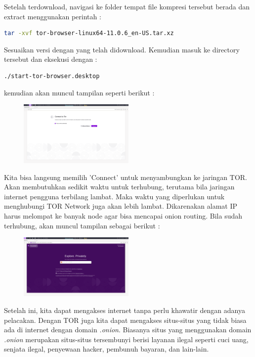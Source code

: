\documentclass{article}
\begin{document}
        Setelah terdownload, navigasi ke folder tempat file kompresi tersebut berada dan
        extract menggunakan perintah :
        \begin{lstlisting}[language=bash]
           tar -xvf tor-browser-linux64-11.0.6_en-US.tar.xz 
        \end{lstlisting}
        Sesuaikan versi dengan yang telah didownload. Kemudian masuk ke directory tersebut
        dan eksekusi dengan :
        \begin{lstlisting}[language=bash]
            ./start-tor-browser.desktop
        \end{lstlisting}
        kemudian akan muncul tampilan seperti berikut :
        \begin{figure}[h]
        \includegraphics[width=0.5\textwidth]{tor-first.png}
        \centering
        \end{figure}

        Kita bisa langsung memilih 'Connect' untuk menyambungkan ke jaringan TOR.
        Akan membutuhkan sedikit waktu untuk terhubung, terutama bila jaringan
        internet pengguna terbilang lambat. Maka waktu yang diperlukan untuk 
        menghubungi TOR Network juga akan lebih lambat. Dikarenakan alamat IP harus
        melompat ke banyak node agar bisa mencapai onion routing.
        Bila sudah terhubung, akan muncul tampilan sebagai berikut :
        \begin{figure}[h]
        \includegraphics[width=0.5\textwidth]{tor-connect.png}
        \centering
        \end{figure}

        Setelah ini, kita dapat mengakses internet tanpa perlu khawatir dengan adanya
        pelacakan. Dengan TOR juga kita dapat mengakses situs-situs yang tidak
        biasa ada di internet dengan domain \textit{.onion}. Biasanya situs yang
        menggunakan domain \textit{.onion} merupakan situs-situs tersembunyi berisi 
        layanan ilegal seperti cuci uang, senjata ilegal, penyewaan hacker, pembunuh
        bayaran, dan lain-lain.
\end{document}
